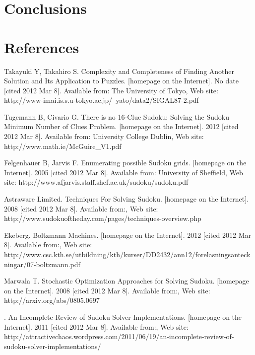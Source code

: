 \documentclass[a4paper,11pt]{kth-mag}
\begin{document}
 

\chapter{Conclusions}


\chapter{References}

\begin{thebibliography}{99}

Takayuki Y, Takahiro S. Complexity and Completeness of Finding Another Solution and Its Application to Puzzles. [homepage on the Internet]. No date [cited 2012 Mar 8]. Available from: The University of Tokyo, Web site: http://www-imai.is.s.u-tokyo.ac.jp/~yato/data2/SIGAL87-2.pdf

Tugemann B, Civario G. There is no 16-Clue Sudoku: Solving the Sudoku Minimum Number of Clues Problem. [homepage on the Internet]. 2012 [cited 2012 Mar 8]. Available from: University College Dublin, Web site: http://www.math.ie/McGuire\_V1.pdf

Felgenhauer B, Jarvis F. Enumerating possible Sudoku grids. [homepage on the Internet]. 2005 [cited 2012 Mar 8]. Available from: University of Sheffield, Web site: http://www.afjarvis.staff.shef.ac.uk/sudoku/sudoku.pdf

Astraware Limited. Techniques For Solving Sudoku. [homepage on the Internet]. 2008 [cited 2012 Mar 8]. Available from:, Web site: http://www.sudokuoftheday.com/pages/techniques-overview.php

Ekeberg. Boltzmann Machines. [homepage on the Internet]. 2012 [cited 2012 Mar 8]. Available from:, Web site: http://www.csc.kth.se/utbildning/kth/kurser/DD2432/ann12/forelasningsanteckningar/07-boltzmann.pdf

Marwala T. Stochastic Optimization Approaches for Solving Sudoku. [homepage on the Internet]. 2008 [cited 2012 Mar 8]. Available from:, Web site: http://arxiv.org/abs/0805.0697

. An Incomplete Review of Sudoku Solver Implementations. [homepage on the Internet]. 2011 [cited 2012 Mar 8]. Available from:, Web site: http://attractivechaos.wordpress.com/2011/06/19/an-incomplete-review-of-sudoku-solver-implementations/


\end{thebibliography}
\end{document}
